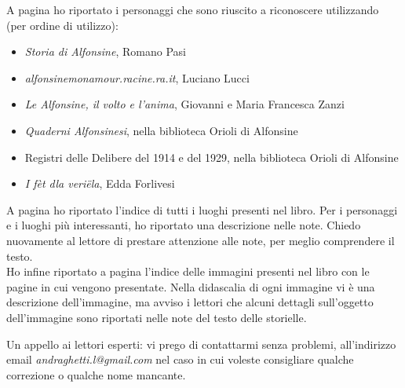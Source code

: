 \label{fonti}
\noindent A pagina \pageref{Personaggi} ho riportato i personaggi che sono riuscito a riconoscere utilizzando (per ordine di utilizzo):
\begin{itemize}\itemsep2pt
\item{\emph{Storia di Alfonsine}, Romano Pasi}
\item{\emph{alfonsinemonamour.racine.ra.it}, Luciano Lucci}
\item{\emph{Le Alfonsine, il volto e l'anima}, Giovanni e Maria Francesca Zanzi}
\item{\emph{Quaderni Alfonsinesi}, nella biblioteca Orioli di Alfonsine}
\item{Registri delle Delibere del 1914 e del 1929, nella biblioteca Orioli di Alfonsine}
\item{\emph{I fèt dla veriëla}, Edda Forlivesi}
\end{itemize}

A pagina \pageref{Luoghi} ho riportato l'indice di tutti i luoghi presenti nel libro. Per i personaggi e i luoghi più interessanti, ho riportato una descrizione nelle note. Chiedo nuovamente al lettore di prestare attenzione alle note, per meglio comprendere il testo.\\

Ho infine riportato a pagina \pageref{Immagini} l'indice delle immagini presenti nel libro con le pagine in cui vengono presentate. Nella didascalia di ogni immagine vi è una descrizione dell'immagine, ma avviso i lettori che alcuni dettagli sull'oggetto dell'immagine sono riportati nelle note del testo delle storielle.

\vspace{1cm}

Un appello ai lettori esperti: vi prego di contattarmi senza problemi, all'indirizzo email \textit{andraghetti.l@gmail.com} nel caso in cui voleste consigliare qualche correzione o qualche nome mancante.\\

